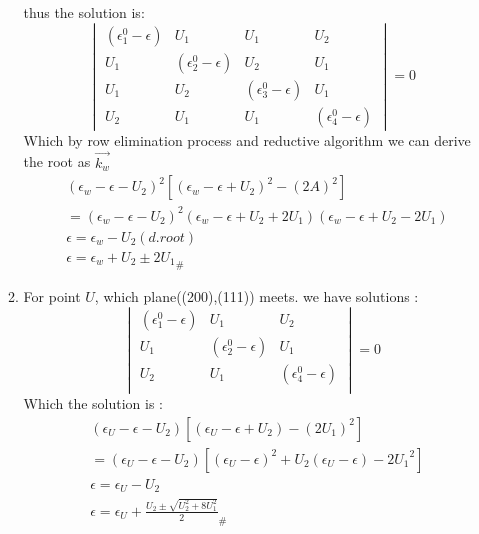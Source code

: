 \documentclass[notitlepage]{revtex4-1}
\begin{document}
\begin{CJK}{UTF8}{bsmi}
\begin{enumerate}
\begin{enumerate}[label=(\alph*)]
		thus the solution is:
		\begin{equation}
			\begin{vmatrix}
				( \epsilon^{0}_1 - \epsilon ) & U_1 & U_1 & U_2 \\
				U_1 & ( \epsilon^{0}_2 - \epsilon ) & U_2 & U_1 \\
				U_1 & U_2 &( \epsilon^{0}_3 - \epsilon ) &  U_1 \\
				U_2 & U_1 & U_1 &( \epsilon^{0}_4 - \epsilon )  
			\end{vmatrix} = 0
		\end{equation}
		    Which by row elimination process and reductive algorithm we can derive the root as $\vec{k_w}$ 
		\begin{align}
			&(\epsilon_w - \epsilon - U_2)^{2} \left[ (\epsilon_w - \epsilon + U_2)^{2} - (2A)^{2} \right] \\
			&= (\epsilon_w - \epsilon - U_2)^{2}(\epsilon_w - \epsilon + U_2 + 2U_1)(\epsilon_w - \epsilon + U_2 - 2U_1) \\
			&\epsilon = \epsilon_w - U_2 (d.root) \\
			&\epsilon = \epsilon_w + U_2 \pm 2{U_1}_{\#}
		\end{align}
		
		\item For point $U$, which plane((200),(111)) meets. we have solutions : 
		 \begin{equation}
		 \begin{vmatrix}
			 ( \epsilon^{0}_1 - \epsilon ) & U_1 & U_2 \\
			 U_1 & ( \epsilon^{0}_2 - \epsilon )  & U_1 \\
			 U_2 & U_1 &( \epsilon^{0}_4 - \epsilon )  \\
		 \end{vmatrix} = 0
		 \end{equation}
		 Which the solution is :
		\begin{align}
			& (\epsilon_U - \epsilon - U_2)\left[ (\epsilon_U - \epsilon + U_2)-(2U_1)^{2} \right] \\
			&= (\epsilon_U - \epsilon - U_2)\left[ (\epsilon_U - \epsilon)^2 + U_2(\epsilon_U - \epsilon) - 2{U_1}^2 \right] \\
			&\epsilon = \epsilon_U - U_2 \\
			&\epsilon = \epsilon_U + {\frac{U_2 \pm \sqrt{U_2^2+ 8U_1^2}}{2}}_{\#}
		\end{align}
		 
	\end{enumerate}


\end{enumerate}
\end{CJK}
\end{document}

